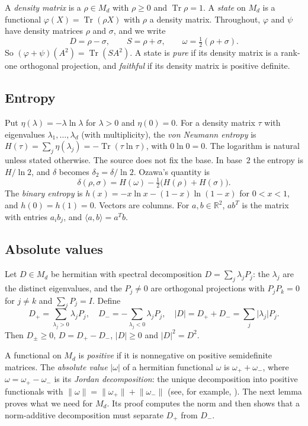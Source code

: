 \documentclass[11pt]{amsart}
\theoremstyle{definition}\newtheorem{definition}[theorem]{Definition}
\theoremstyle{remark}\newtheorem{remark}[theorem]{Remark}
\DeclareMathOperator{\Tr}{Tr}
\newcommand{\R}{\mathbb{R}}
\newcommand{\abs}[1]{\lvert #1\rvert}
\newcommand{\norm}[1]{\lVert #1\rVert}
\begin{document}
A \emph{density matrix} is a \(\rho\in M_d\) with \(\rho\ge0\) and \(\Tr\rho=1\). A \emph{state} on \(M_d\) is a functional \(\varphi(X)=\Tr(\rho X)\) with \(\rho\) a density matrix. Throughout, \(\varphi\) and \(\psi\) have density matrices \(\rho\) and \(\sigma\), and we write
\[
D=\rho-\sigma,\qquad S=\rho+\sigma,\qquad \omega=\tfrac12(\rho+\sigma).
\]
So \((\varphi+\psi)(A^2)=\Tr(SA^2)\). A state is \emph{pure} if its density matrix is a rank-one orthogonal projection, and \emph{faithful} if its density matrix is positive definite.

\subsection{Entropy}
Put \(\eta(\lambda)=-\lambda\ln\lambda\) for \(\lambda>0\) and \(\eta(0)=0\). For a density matrix \(\tau\) with eigenvalues \(\lambda_1,\dots,\lambda_d\) (with multiplicity), the \emph{von Neumann entropy} is \(H(\tau)=\sum_j\eta(\lambda_j)=-\Tr(\tau\ln\tau)\), with \(0\ln0=0\). The logarithm is natural unless stated otherwise. The source does not fix the base. In base~\(2\) the entropy is \(H/\ln2\), and \(\delta\) becomes \(\delta_2=\delta/\ln2\). Ozawa's quantity is
\[
\delta(\rho,\sigma)=H(\omega)-\tfrac12\bigl(H(\rho)+H(\sigma)\bigr).
\]
The \emph{binary entropy} is \(h(x)=-x\ln x-(1-x)\ln(1-x)\) for \(0<x<1\), and \(h(0)=h(1)=0\). Vectors are columns. For \(a,b\in\R^2\), \(ab^{T}\) is the matrix with entries \(a_ib_j\), and \(\langle a,b\rangle=a^{T}b\).

\subsection{Absolute values}
Let \(D\in M_d\) be hermitian with spectral decomposition \(D=\sum_j\lambda_jP_j\): the \(\lambda_j\) are the distinct eigenvalues, and the \(P_j\ne0\) are orthogonal projections with \(P_jP_k=0\) for \(j\ne k\) and \(\sum_jP_j=I\). Define
\[
D_+=\sum_{\lambda_j>0}\lambda_jP_j,\quad D_-=-\sum_{\lambda_j<0}\lambda_jP_j,\quad \abs{D}=D_++D_-=\sum_j\abs{\lambda_j}P_j .
\]
Then \(D_\pm\ge0\), \(D=D_+-D_-\), \(\abs{D}\ge0\) and \(\abs{D}^2=D^2\).

A functional on \(M_d\) is \emph{positive} if it is nonnegative on positive semidefinite matrices. The \emph{absolute value} \(\abs{\omega}\) of a hermitian functional \(\omega\) is \(\omega_++\omega_-\), where \(\omega=\omega_+-\omega_-\) is its \emph{Jordan decomposition}: the unique decomposition into positive functionals with \(\norm{\omega}=\norm{\omega_+}+\norm{\omega_-}\) (see, for example, \cite{takesaki79}). The next lemma proves what we need for \(M_d\). Its proof computes the norm and then shows that a norm-additive decomposition must separate \(D_+\) from \(D_-\).
\end{document}
